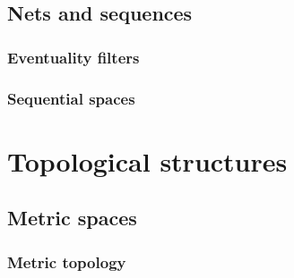 \documentclass{../note}
\begin{document}
\chapter{Nets and sequences}
\section{Eventuality filters}
\section{Sequential spaces}





\part{Topological structures}

\chapter{Metric spaces}
\section{Metric topology}
\end{document}

